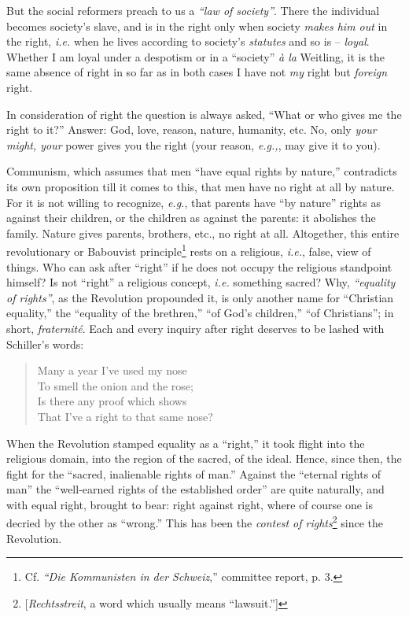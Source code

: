 But the social reformers preach to us a \textit{``law of society''}. There 
the individual becomes society's slave, and is in the right only when society 
\textit{makes him out} in the right, \textit{i.e.} when he lives according to 
society's \textit{statutes} and so is -- \textit{loyal}. Whether I am loyal 
under a despotism or in a ``society'' \textit{\`a la} Weitling, it is the 
same absence of right in so far as in both cases I have not \textit{my} right 
but \textit{foreign} right.

In consideration of right the question is always asked, ``What or who gives 
me the right to it?'' Answer: God, love, reason, nature, humanity, etc. No, 
only \textit{your might, your} power gives you the right (your reason, 
\textit{e.g.,}, may give it to you).

Communism, which assumes that men ``have equal rights by nature,'' 
contradicts its own proposition till it comes to this, that men have no right 
at all by nature. For it is not willing to recognize, \textit{e.g.}, that 
parents have ``by nature'' rights as against their children, or the children 
as against the parents: it abolishes the family. Nature gives parents, 
brothers, etc., no right at all. Altogether, this entire revolutionary or 
Babouvist principle\footnote{Cf. \textit{``Die Kommunisten in der 
Schweiz},'' committee report, p. 3.} rests on a religious, \textit{i.e.}, 
false, view of things. Who can ask after ``right'' if he does not occupy the 
religious standpoint himself? Is not ``right'' a religious concept, 
\textit{i.e.} something sacred? Why, \textit{``equality of rights''}, as the 
Revolution propounded it, is only another name for ``Christian equality,'' 
the ``equality of the brethren,'' ``of God's children,'' ``of 
Christians''; in short, \textit{fraternit\'e}. Each and every inquiry after 
right deserves to be lashed with Schiller's words:

\begin{quotation}

\noindent{} Many a year I've used my nose\\
 To smell the onion and the rose;\\
 Is there any proof which shows\\
 That I've a right to that same nose? \end{quotation}

\noindent{}When the Revolution stamped equality as a ``right,'' it took 
flight into the religious domain, into the region of the sacred, of the ideal. 
Hence, since then, the fight for the ``sacred, inalienable rights of man.'' 
Against the ``eternal rights of man'' the ``well-earned rights of the 
established order'' are quite naturally, and with equal right, brought to 
bear: right against right, where of course one is decried by the other as 
``wrong.'' This has been the \textit{contest of 
rights}\footnote{[\textit{Rechtsstreit}, a word which usually means 
``lawsuit.'']} since the Revolution.

